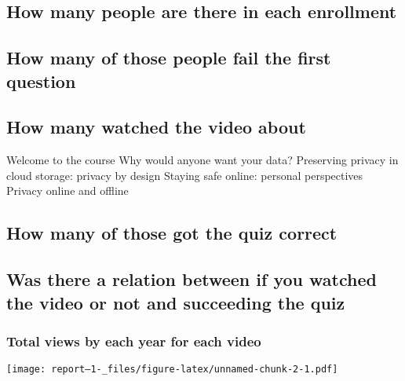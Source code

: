 \documentclass[
]{article}
\author{}
\date{\vspace{-2.5em}}
\begin{document}
\hypertarget{how-many-people-are-there-in-each-enrollment}{%
\subsection{How many people are there in each
enrollment}\label{how-many-people-are-there-in-each-enrollment}}

\hypertarget{how-many-of-those-people-fail-the-first-question}{%
\subsection{How many of those people fail the first
question}\label{how-many-of-those-people-fail-the-first-question}}

\hypertarget{how-many-watched-the-video-about}{%
\subsection{How many watched the video
about}\label{how-many-watched-the-video-about}}

Welcome to the course Why would anyone want your data? Preserving
privacy in cloud storage: privacy by design Staying safe online:
personal perspectives Privacy online and offline

\hypertarget{how-many-of-those-got-the-quiz-correct}{%
\subsection{How many of those got the quiz
correct}\label{how-many-of-those-got-the-quiz-correct}}

\hypertarget{was-there-a-relation-between-if-you-watched-the-video-or-not-and-succeeding-the-quiz}{%
\subsection{Was there a relation between if you watched the video or not
and succeeding the
quiz}\label{was-there-a-relation-between-if-you-watched-the-video-or-not-and-succeeding-the-quiz}}

\hypertarget{total-views-by-each-year-for-each-video}{%
\subsubsection{Total views by each year for each
video}\label{total-views-by-each-year-for-each-video}}

\texttt{[image: report--1-\_files/figure-latex/unnamed-chunk-2-1.pdf]}
\end{document}
